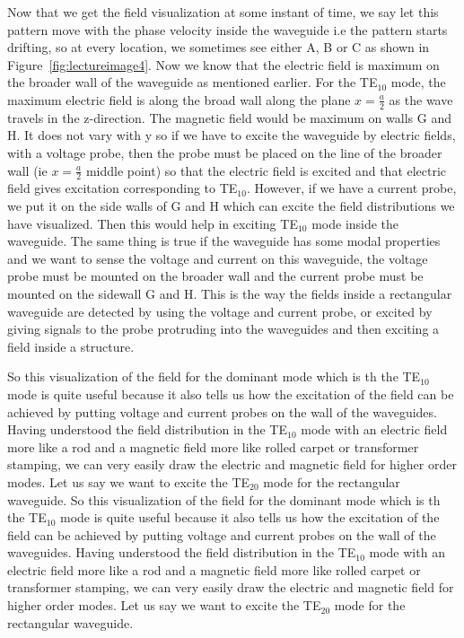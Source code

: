 Now that we get the field visualization at some instant of time, we say let this pattern move with the phase velocity inside the waveguide i.e the pattern starts drifting, so at every location, we sometimes see either A, B or C as shown in Figure~\ref{fig:lectureimage4}. Now we know that the electric field is maximum on the broader wall of the waveguide as mentioned earlier. For the TE$_{10}$ mode, the maximum electric field is along the broad wall along the plane $x = \frac{a}{2}$ as the wave travels in the z-direction. The magnetic field would be maximum on walls G and H. It does not vary with y so if we have to excite the waveguide by electric fields, with a voltage probe, then the probe must be placed on the line of the broader wall (ie $x = \frac{a}{2}$ middle point) so that the electric field is excited and that electric field gives excitation corresponding to TE$_{10}$. However, if we have a current probe, we put it on the side walls of G and H which can excite the field distributions we have visualized. Then this would help in exciting TE$_{10}$ mode inside the waveguide. The same thing is true if the waveguide has some modal properties and we want to sense the voltage and current on this waveguide, the voltage probe must be mounted on the broader wall and the current probe must be mounted on the sidewall G and H. This is the way the fields inside a rectangular waveguide are detected by using the voltage and current probe, or excited by giving signals to the probe protruding into the waveguides and then exciting a field inside a structure.

So this visualization of the field for the dominant mode which is th the TE$_{10}$ mode is quite useful because it also tells us how the excitation of the field can be achieved by putting voltage and current probes on the wall of the waveguides. Having understood the field distribution in the  TE$_{10}$ mode with an electric field more like a rod and a magnetic field more like rolled carpet or transformer stamping, we can very easily draw the electric and magnetic field for higher order modes. Let us say we want to excite the TE$_{20}$ mode for the rectangular waveguide.
So this visualization of the field for the dominant mode which is th the TE$_{10}$ mode is quite useful because it also tells us how the excitation of the field can be achieved by putting voltage and current probes on the wall of the waveguides. Having understood the field distribution in the  TE$_{10}$ mode with an electric field more like a rod and a magnetic field more like rolled carpet or transformer stamping, we can very easily draw the electric and magnetic field for higher order modes. Let us say we want to excite the TE$_{20}$ mode for the rectangular waveguide.

